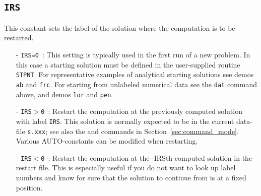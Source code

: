 \documentclass[12pt]{report}
\begin{document}
\subsection{\tt IRS}  \label{sec:IRS}
This constant sets the label of the solution where the computation
is to be restarted.
\begin{itemize}
\item[-] {\tt IRS=0}~:  
  This setting is typically used in the first run of a new problem.
  In this case a starting solution must be defined in the user-supplied
  routine {\tt STPNT}.
  For representative examples of analytical starting solutions 
  see demos {\tt ab} and {\tt frc}.
  For starting from unlabeled numerical data see the {\tt dat} command
  above, and demos {\tt lor} and {\tt pen}.
  
\item[-] {\tt IRS$>$0}~: 
  Restart the computation at the previously computed solution with label {\tt IRS}. 
  This solution is normally expected to be in the current data-file 
 {\tt s.xxx}; see also the  and  commands in 
 Section~\ref{sec:command_mode}.
 Various {\cal AUTO}-constants can be modified when restarting.

\item[-] {\tt IRS$<$0}~:
  Restart the computation at the -IRSth computed solution in the
  restart file. This is especially useful if you do not want to look
  up label numbers and know for sure that the solution to continue
  from is at a fixed position.
\end{itemize}
\end{document}
